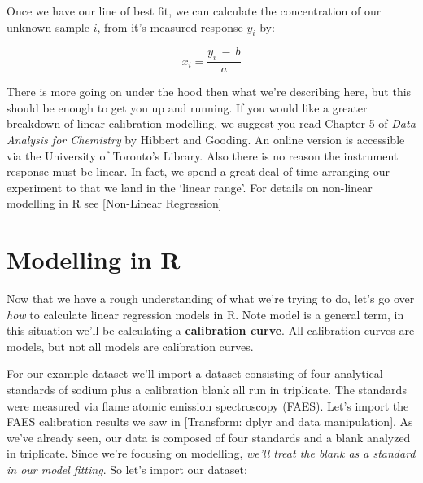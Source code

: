 \documentclass[
]{book}
\begin{document}
Once we have our line of best fit, we can calculate the concentration of our unknown sample \(i\), from it's measured response \(y_i\) by:

\[ x_i = \frac{y_i ~-~b}{a}\]

There is more going on under the hood then what we're describing here, but this should be enough to get you up and running. If you would like a greater breakdown of linear calibration modelling, we suggest you read Chapter 5 of \emph{Data Analysis for Chemistry} by Hibbert and Gooding. An online version is accessible via the University of Toronto's Library. Also there is no reason the instrument response must be linear. In fact, we spend a great deal of time arranging our experiment to that we land in the `linear range'. For details on non-linear modelling in R see {[}Non-Linear Regression{]}

\hypertarget{modelling-in-r}{%
\section{Modelling in R}\label{modelling-in-r}}

Now that we have a rough understanding of what we're trying to do, let's go over \emph{how} to calculate linear regression models in R. Note model is a general term, in this situation we'll be calculating a \textbf{calibration curve}. All calibration curves are models, but not all models are calibration curves.

For our example dataset we'll import a dataset consisting of four analytical standards of sodium plus a calibration blank all run in triplicate. The standards were measured via flame atomic emission spectroscopy (FAES). Let's import the FAES calibration results we saw in {[}Transform: dplyr and data manipulation{]}. As we've already seen, our data is composed of four standards and a blank analyzed in triplicate. Since we're focusing on modelling, \emph{we'll treat the blank as a standard in our model fitting}.
So let's import our dataset:
\end{document}
